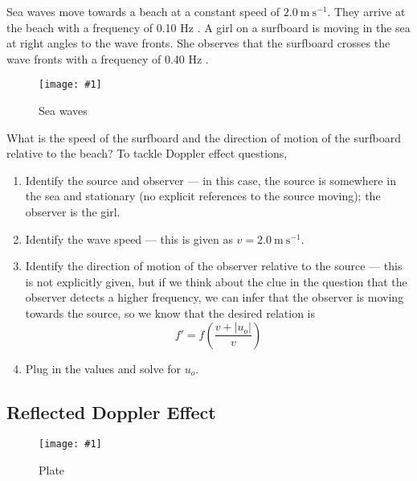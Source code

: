 \documentclass[a4paper,12pt]{article}
\newcommand{\img}[4]{\begin{center}
  \begin{figure}[H]
    \centering
    \texttt{[image: \#1]}
    \caption{#3}
    \label{fig:#4}
  \end{figure}
\end{center}}
\newcommand{\paren}[1]{\left(#1\right)}
\begin{document}
Sea waves move towards a beach at a constant speed of $2.0 \mathrm{~m} \mathrm{~s}^{-1}$. They arrive at the beach with a frequency of 0.10 Hz . A girl on a surfboard is moving in the sea at right angles to the wave fronts. She observes that the surfboard crosses the wave fronts with a frequency of 0.40 Hz .
\img{ex/sea.png}{0.5}{Sea waves}{sea}
What is the speed of the surfboard and the direction of motion of the surfboard relative to the beach? To tackle Doppler effect questions,
\begin{enumerate}
  \item Identify the source and observer --- in this case, the source is somewhere in the sea and stationary (no explicit references to the source moving); the observer is the girl.
  \item Identify the wave speed --- this is given as $v = 2.0 \mathrm{~m} \mathrm{~s}^{-1}$.
  \item Identify the direction of motion of the observer relative to the source --- this is not explicitly given, but if we think about the clue in the question that the observer detects a higher frequency, we can infer that the observer is moving towards the source, so we know that the desired relation is
        $$f' = f\paren{\frac{v + |u_o|}{v}}$$
  \item Plug in the values and solve for $u_o$.
\end{enumerate}

\subsection{Reflected Doppler Effect}

\img{ex/plate.png}{0.5}{Plate}{plate}
\end{document}
